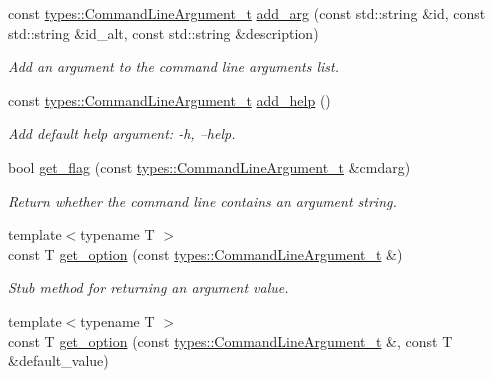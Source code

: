 \begin{DoxyCompactItemize}
const \hyperlink{structcppargparse_1_1types_1_1CommandLineArgument__t}{types\+::\+Command\+Line\+Argument\+\_\+t} \hyperlink{classcppargparse_1_1parser_1_1ArgumentParserBase_ad1bb9bf2be4793b3442679fa2090bc2d}{add\+\_\+arg} (const std\+::string \&id, const std\+::string \&id\+\_\+alt, const std\+::string \&description)
\begin{DoxyCompactList}\small\item\em Add an argument to the command line arguments list. \end{DoxyCompactList}\item 
\mbox{\label{classcppargparse_1_1parser_1_1ArgumentParserBase_aaa2d68da1d224500fa290040de72ff01}} 
const \hyperlink{structcppargparse_1_1types_1_1CommandLineArgument__t}{types\+::\+Command\+Line\+Argument\+\_\+t} \hyperlink{classcppargparse_1_1parser_1_1ArgumentParserBase_aaa2d68da1d224500fa290040de72ff01}{add\+\_\+help} ()
\begin{DoxyCompactList}\small\item\em Add default help argument\+: -\/h, --help. \end{DoxyCompactList}\item 
bool \hyperlink{classcppargparse_1_1parser_1_1ArgumentParserBase_aa95fba161ea60c65972e76025419b8d9}{get\+\_\+flag} (const \hyperlink{structcppargparse_1_1types_1_1CommandLineArgument__t}{types\+::\+Command\+Line\+Argument\+\_\+t} \&cmdarg)
\begin{DoxyCompactList}\small\item\em Return whether the command line contains an argument string. \end{DoxyCompactList}\item 
{\footnotesize template$<$typename T $>$ }\\const T \hyperlink{classcppargparse_1_1parser_1_1ArgumentParserBase_ae26532c710a553810a784d2243572e34}{get\+\_\+option} (const \hyperlink{structcppargparse_1_1types_1_1CommandLineArgument__t}{types\+::\+Command\+Line\+Argument\+\_\+t} \&)
\begin{DoxyCompactList}\small\item\em Stub method for returning an argument value. \end{DoxyCompactList}\item 
{\footnotesize template$<$typename T $>$ }\\const T \hyperlink{classcppargparse_1_1parser_1_1ArgumentParserBase_ae5f8dfec70ef927bc315e39046dcf63e}{get\+\_\+option} (const \hyperlink{structcppargparse_1_1types_1_1CommandLineArgument__t}{types\+::\+Command\+Line\+Argument\+\_\+t} \&, const T \&default\+\_\+value)

\end{DoxyCompactItemize}
